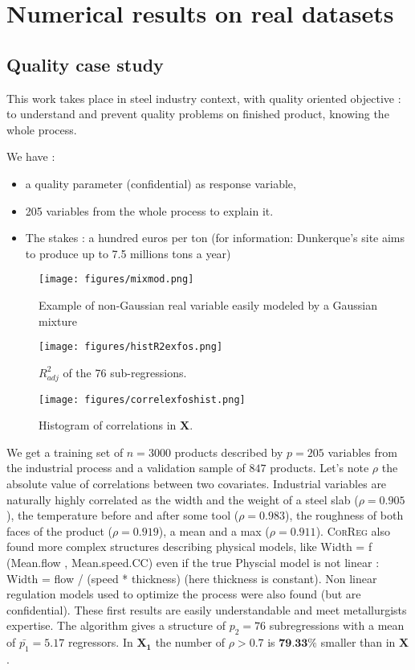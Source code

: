 \documentclass[11pt,a4paper]{article}
\begin{document}
	\clearpage	
\section{Numerical results on real datasets} \label{sectionrealcase}
\subsection{Quality case study} \label{sectionexfos}
This work takes place in steel industry context, with quality oriented objective : to understand and prevent quality problems on finished product, knowing the whole process. 
		
We have :
		\begin{itemize}
			\item a quality parameter (confidential) as response variable,
			\item 205 variables from the whole process to explain it.
			\item The stakes : a hundred euros per ton (for information: Dunkerque's  site aims to produce up to 7.5 millions tons a year)
		\end{itemize}
		
\begin{figure}[h!]
	\begin{minipage}[l]{.30\linewidth}
			\texttt{[image: figures/mixmod.png]} 
			\caption{Example of non-Gaussian real variable easily modeled by a Gaussian mixture}\label{graphMixmod}
	\end{minipage} \hfill
	\begin{minipage}[c]{.30\linewidth}
			\texttt{[image: figures/histR2exfos.png]} 
			\caption{$R^2_{adj}$ of the 76 sub-regressions.}
	\end{minipage} \hfill
   \begin{minipage}[r]{.30\linewidth}
			\texttt{[image: figures/correlexfoshist.png]} 
			\caption{Histogram of correlations in $\boldsymbol{X}$.} \label{compareMSEexfos}
   \end{minipage}
\end{figure}   			
	We get a training set of $n=3 000$ products described by $p=205$ variables from the industrial process and a validation sample of $847$ products.
	Let's note $\rho$ the absolute value of correlations between two covariates. Industrial variables are naturally highly correlated as the width and the weight of a steel slab ($\rho=0.905$), the temperature before and after some tool ($\rho=0.983$), the  roughness of both faces of the product ($\rho= 0.919$), a mean and a max ($\rho=0.911$). \textsc{CorReg} also found more complex structures describing physical models, like   Width = f (Mean.flow , Mean.speed.CC) even if the true Physcial model is not linear : Width = flow / (speed * thickness) (here thickness is constant). Non linear regulation models used to optimize the process were also found (but are confidential). These first results are easily understandable and meet metallurgists expertise.  
			The algorithm gives a structure of $p_2=76$ subregressions with a mean of $\bar{p_1}=5.17$ regressors. In $\boldsymbol{X_1}$ the number of $\rho>0.7$ is $\textbf{79.33\%}$ smaller than in $\boldsymbol{X}$.		
	
\end{document}
